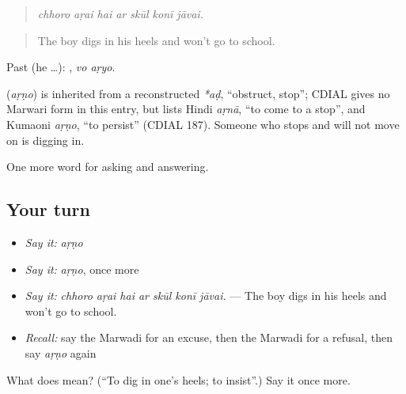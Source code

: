 \begin{quote}
      
\end{quote}

\begin{quote}
\emph{chhoro aṛai hai ar skūl konī jāvai.}
\end{quote}

\begin{quote}
The boy digs in his heels and won't go to school.
\end{quote}

Past (he …):  , \emph{vo aṛyo}.

\begin{cousinweb}
\textbf{} (\emph{aṛṇo}) is inherited from a reconstructed \emph{*aḍ}, \textquotedblleft{}obstruct, stop\textquotedblright{}; CDIAL gives no Marwari form in this entry, but lists Hindi \emph{aṛnā}, \textquotedblleft{}to come to a stop\textquotedblright{}, and Kumaoni \emph{aṛṇo}, \textquotedblleft{}to persist\textquotedblright{} (CDIAL 187). Someone who stops and will not move on is digging in.
\end{cousinweb}

\begin{grammarlens}[title={What you've built}]
One more word for asking and answering.
\end{grammarlens}

\subsection*{Your turn}
\begin{itemize}
\raggedright
  \item \emph{Say it:} \emph{aṛṇo}
  \item \emph{Say it:} \emph{aṛṇo}, once more
  \item \emph{Say it:} \emph{chhoro aṛai hai ar skūl konī jāvai.} — The boy digs in his heels and won't go to school.
  \item \emph{Recall:} say the Marwadi for an excuse, then the Marwadi for a refusal, then say \emph{aṛṇo} again
\end{itemize}

\begin{tcolorbox}[breakable,colback=teal!4,colframe=teal!35!black,title={Before you move on}]
What does  mean? (\textquotedblleft{}To dig in one's heels; to insist\textquotedblright{}.) Say it once more.
\end{tcolorbox}
